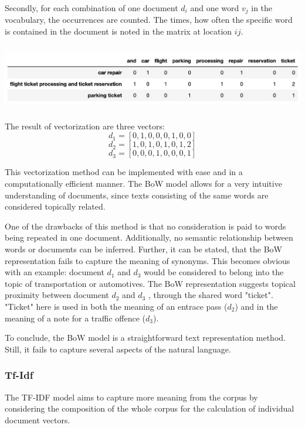             Secondly, for each combination of one document $ d_{i} $ and one word $ v_{j} $ in the vocabulary, the occurrences are counted. The times, how often the specific word is contained in the document is noted in the matrix at location $  ij $.
            
            \includegraphics[height=2.9cm]{Bilder/bow.png}
    
            The result of vectorization are three vectors:
            \[ d_{1} = [0,1,0,0,0,1,0,0] \]
            \[ d_{2} = [1,0,1,0,1,0,1,2] \]	
            \[ d_{3} = [0,0,0,1,0,0,0,1]\]
    
    
            This vectorization method can be implemented with ease and in a computationally efficient manner. The \ac{BoW} model allows for a very intuitive understanding of documents, since texts consisting of the same words are considered topically related. 
            
            One of the drawbacks of this method is that no consideration is paid to words being repeated in one document. Additionally, no semantic relationship between words or documents can be inferred. 
            Further, it can be stated, that the \ac{BoW} representation fails to capture the meaning of synonyms. This becomes obvious with an example: document $ d_{1} $ and $ d_{3}$ would be considered to belong into the topic of transportation or automotives. The \ac{BoW} representation suggests topical proximity between document $ d_{2} $ and $ d_{3}$ , through the shared word "ticket". "Ticket" here is used in both the meaning of an entrace pass ($d_{2}$) and in the meaning of a note for a traffic offence  ($d_{3}$). 
            
            To conclude, the \ac{BoW} model is a straightforward text representation method. Still, it fails to capture several aspects of the natural language.
            
            \subsubsection{Tf-Idf}
            The \ac{TF-IDF} model aims to capture more meaning from the corpus by considering the composition of the whole corpus for the calculation of individual document vectors.
            
